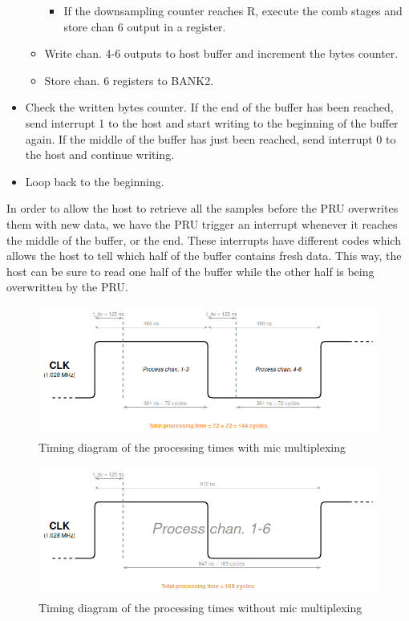\documentclass[]{report}
\providecommand{\tightlist}{%
	\setlength{\itemsep}{0pt}\setlength{\parskip}{0pt}}
\begin{document}
\begin{itemize}
\begin{itemize}
    \begin{itemize}
    \tightlist
    \item
      If the downsampling counter reaches R, execute the comb stages and
      store chan 6 output in a register.
    \end{itemize}
  \item
    Write chan. 4-6 outputs to host buffer and increment the bytes counter.
  \item
    Store chan. 6 registers to BANK2.
  \end{itemize}
\item
  Check the written bytes counter. If the end of the buffer has been
  reached, send interrupt 1 to the host and start writing to the
  beginning of the buffer again. If the middle of the buffer has just
  been reached, send interrupt 0 to the host and continue writing.
\item
  Loop back to the beginning.
\end{itemize}

In order to allow the host to retrieve all the samples before the PRU overwrites them with new data, we have the PRU trigger an interrupt whenever it reaches the middle of the buffer, or the end. These interrupts have different codes which allows the host to tell which half of the buffer contains fresh data. This way, the host can be sure to read one half of the buffer while the other half is being overwritten by the PRU.

\begin{figure}[H]
\centering
\includegraphics[width=1.0\linewidth]{Pictures/PRU_timing_diagram_mic_multiplexing.png}
\caption{Timing diagram of the processing times with mic multiplexing}
\label{fig:multiplex-mics}
\end{figure}

\begin{figure}[H]
\centering
\includegraphics[width=1.0\linewidth]{Pictures/PRU_timing_diagram_no_mic_multiplexing.png}
\caption{Timing diagram of the processing times without mic
multiplexing}
\label{fig:nonmultiplex-mics}
\end{figure}
\end{document}
